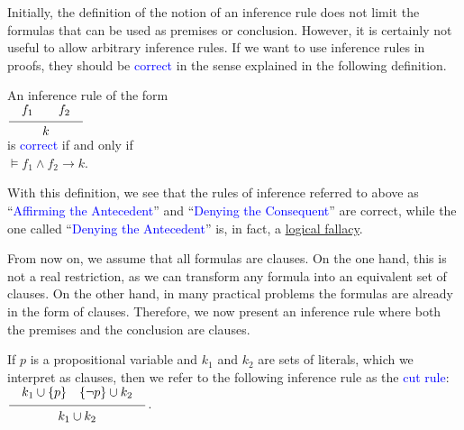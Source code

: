 \noindent
Initially, the definition of the notion of an inference rule does not limit the formulas that can be used as premises
or conclusion. However, it is certainly not useful to allow arbitrary inference rules. If we want to use
inference rules in proofs, they should be \textcolor{blue}{correct} in the sense explained in the following definition.

\begin{Definition}
  An inference rule of the form \\[0.2cm]
  \hspace*{1.3cm} $\schluss{f_1 \qquad f_2}{k}$ \\[0.2cm]
  is \textcolor{blue}{correct} if and only if 
  \\[0.2cm]
  \hspace*{1.3cm}
  $\models f_1 \wedge f_2 \rightarrow k$. \eox
  \\[0.2cm]\mbox{}


\end{Definition}
With this definition, we see that
the rules of inference referred to above as ``\textcolor{blue}{Affirming the Antecedent}'' and
``\textcolor{blue}{Denying the Consequent}''
are correct, while the one called ``\textcolor{blue}{Denying the Antecedent}''
is, in fact, a \href{https://en.wikipedia.org/wiki/List_of_fallacies}{logical fallacy}.

From now on, we assume that all formulas are clauses. On the one hand, this is
not a real restriction, as we can transform any formula into an equivalent set of
clauses. On the other hand, in many practical problems the formulas are already in the form of
clauses. Therefore, we now present an inference rule where both the premises and the conclusion are clauses.
     
\begin{Definition}
    If $p$ is a propositional variable and $k_1$ and $k_2$ are sets of literals,
    which we interpret as clauses, then we refer to the following inference rule
    as the \textcolor{blue}{cut rule}: 
    \\[0.2cm]
    \hspace*{1.3cm}
    $\ds \schluss{ k_1 \cup \{p\} \quad \{\neg p\} \cup k_2 }{k_1 \cup k_2}$. 
    \eox
\end{Definition}

